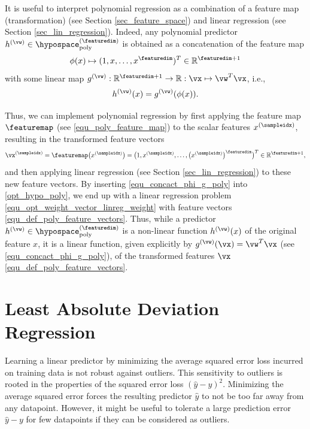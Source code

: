 \documentclass[12pt]{report}
\begin{document}
It is useful to interpret polynomial regression as a combination 
of a feature map (transformation) (see Section \ref{sec_feature_space}) 
and linear regression (see Section \ref{sec_lin_regression}). Indeed, 
any polynomial predictor $h^{(\vw)} \in \hypospace_{\rm poly}^{(\featuredim)}$ 
is obtained as a concatenation of the feature map  
\begin{equation}
\label{equ_poly_feature_map} 
\phi(x) \mapsto (1,x,\ldots,x^{\featuredim})^{T} \in \mathbb{R}^{\featuredim+1}
\end{equation}
with some linear map $g^{(\vw)}: \mathbb{R}^{\featuredim+1} \rightarrow \mathbb{R}: \vx \mapsto \vw^{T} \vx$, i.e., 
\begin{equation}
\label{equ_concact_phi_g_poly}
h^{(\vw)}(x) = g^{(\vw)}(\phi(x)). 
\end{equation}

Thus, we can implement polynomial regression by first applying 
the feature map $\featuremap$ (see \eqref{equ_poly_feature_map}) to 
the scalar features $x^{(\sampleidx)}$, resulting in the transformed 
feature vectors 
\begin{equation} 
\label{equ_def_poly_feature_vectors}
\vx^{(\sampleidx)} = \featuremap \big(x^{(\sampleidx)}\big) = \big(1,x^{(\sampleidx)},\ldots,\big( x^{(\sampleidx)} \big)^{\featuredim} \big)^{T} \in \mathbb{R}^{\featuredim+1}, 
\end{equation} 
and then applying linear regression  (see Section \ref{sec_lin_regression}) 
to these new feature vectors. By inserting \eqref{equ_concact_phi_g_poly} 
into \eqref{opt_hypo_poly}, we end up with a linear regression problem 
\eqref{equ_opt_weight_vector_linreg_weight} with feature vectors \eqref{equ_def_poly_feature_vectors}. 
Thus, while a predictor $h^{(\vw)} \in \hypospace_{\rm poly}^{(\featuredim)}$ 
is a non-linear function $h^{(\vw)}(x)$ of the original feature $x$, it is a linear 
function, given explicitly by $g^{(\vw)}(\vx) = \vw^{T}\vx$ (see \eqref{equ_concact_phi_g_poly}), 
of the transformed features $\vx$ \eqref{equ_def_poly_feature_vectors}. 

\section{Least Absolute Deviation Regression}
\label{sec_lad}

Learning a linear predictor by minimizing the average squared error loss incurred 
on training data is not robust against outliers. This sensitivity to outliers is rooted 
in the properties of the squared error loss $(\hat{y} - y)^{2}$. Minimizing the 
average squared error forces the resulting predictor $\hat{y}$ to not be too far 
away from any datapoint. However, it might be useful to tolerate a large prediction 
error $\hat{y}-y$ for few datapoints if they can be considered as outliers. 
\end{document}

